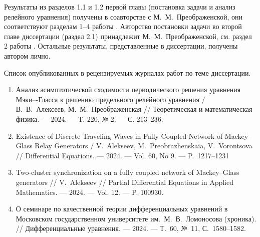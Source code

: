{\contribution} Результаты из разделов 1.1 и 1.2 первой главы (постановка задачи и анализ релейного уравнения) получены в соавторстве с М.~М.~Преображенской, они соответствуют разделам 1--4 работы \cite{wosbib1}. Авторство постановки задачи во второй главе диссертации (раздел 2.1) принадлежит М.~М.~Преображенской, см. раздел 2 работы \cite{wosbib2}. Остальные результаты, представленные в диссертации, получены автором лично.

Список опубликованных в рецензируемых журналах работ по теме диссертации.
\begin{enumerate}
	\item Анализ асимптотической сходимости периодического решения уравнения Мэки–-Гласса к решению предельного релейного уравнения / В.~В.~Алексеев, М.~М.~Преображенская // Теоретическая и математическая физика. --- 2024. --- Т. 220, № 2. --- С. 213--236. \cite{wosbib1}
	\item Existence of Discrete Traveling Waves in Fully Coupled Network of Mackey--Glass Relay Generators / V.~Alekseev, M.~Preobrazhenskaia, V.~Vorontsova // Differential Equations. --- 2024. --- Vol. 60, No 9. --- P.~1217--1231 \cite{wosbib2}
	\item Two-cluster synchronization on a fully coupled network of Mackey--Glass generators // V.~Alekseev // Partial Differential Equations in Applied Mathematics. --- 2024. --- Vol. 12. --- P. 100930. \cite{scbib1}
	\item О семинаре по качественной теории дифференциальных уравнений в Московском государственном университете им.~М.~В.~Ломоносова (хроника). // Дифференциальные уравнения. --- 2024. --- Т.~60, №~11, С.~1580--1582. \cite{Sergeev2024}
\end{enumerate}

\medskip

